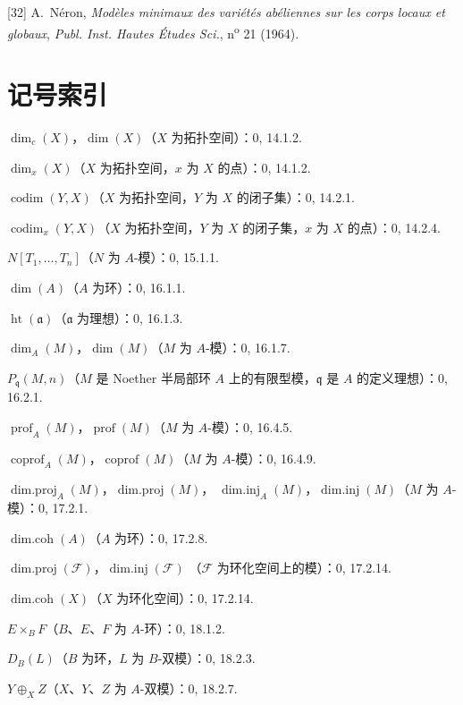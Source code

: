 [32] A.~Néron, \emph{Modèles minimaux des variétés abéliennes sur les corps
locaux et globaux}, \emph{Publ. Inst. Hautes Études Sci.}, n\textsuperscript{o}
21 (1964).

\clearpage
{}
{}
\section*{记号索引}

$\dim_c(X)$，$\dim(X)$（$X$ 为拓扑空间）：0, 14.1.2.\par
$\dim_x(X)$（$X$ 为拓扑空间，$x$ 为 $X$ 的点）：0, 14.1.2.\par
$\operatorname{codim}(Y,X)$（$X$ 为拓扑空间，$Y$ 为 $X$ 的闭子集）：0, 14.2.1.\par
$\operatorname{codim}_x(Y,X)$（$X$ 为拓扑空间，$Y$ 为 $X$ 的闭子集，$x$ 为 $X$ 的点）：0, 14.2.4.\par
$N[T_1,\ldots,T_n]$（$N$ 为 $A$-模）：0, 15.1.1.\par
$\dim(A)$（$A$ 为环）：0, 16.1.1.\par
$\operatorname{ht}(\mathfrak a)$（$\mathfrak a$ 为理想）：0, 16.1.3.\par
$\dim_A(M)$，$\dim(M)$（$M$ 为 $A$-模）：0, 16.1.7.\par
$P_{\mathfrak q}(M,n)$（$M$ 是 Noether 半局部环 $A$ 上的有限型模，$\mathfrak q$ 是 $A$ 的定义理想）：0, 16.2.1.\par
$\operatorname{prof}_A(M)$，$\operatorname{prof}(M)$（$M$ 为 $A$-模）：0, 16.4.5.\par
$\operatorname{coprof}_A(M)$，$\operatorname{coprof}(M)$（$M$ 为 $A$-模）：0, 16.4.9.\par
$\operatorname{dim.proj}_A(M)$，$\operatorname{dim.proj}(M)$，
$\operatorname{dim.inj}_A(M)$，$\operatorname{dim.inj}(M)$（$M$ 为 $A$-模）：0, 17.2.1.\par
$\operatorname{dim.coh}(A)$（$A$ 为环）：0, 17.2.8.\par
$\operatorname{dim.proj}(\mathscr F)$，$\operatorname{dim.inj}(\mathscr F)$
（$\mathscr F$ 为环化空间上的模）：0, 17.2.14.\par
$\operatorname{dim.coh}(X)$（$X$ 为环化空间）：0, 17.2.14.\par
$E\times_B F$（$B$、$E$、$F$ 为 $A$-环）：0, 18.1.2.\par
$D_B(L)$（$B$ 为环，$L$ 为 $B$-双模）：0, 18.2.3.\par
$Y\oplus_X Z$（$X$、$Y$、$Z$ 为 $A$-双模）：0, 18.2.7.\par
